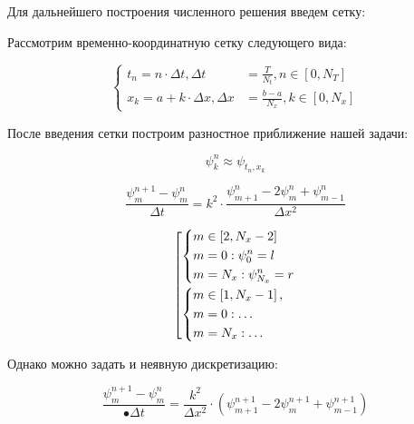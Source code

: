 \documentclass[10pt,a4paper]{article}
\begin{document}
		Для дальнейшего построения численного решения введем сетку:
		
		Рассмотрим временно-координатную сетку следующего вида:
		
		\begin{equation}
			\begin{cases}
				t_{n} = n\cdot \Delta t, \Delta t &= \frac{T}{N_{t}}, n \in 
				\left[0, N_{T}\right]
				\\
				x_{k} = a + k\cdot \Delta x, \Delta x &= \frac{b - a}{N_{x}}, 
				k \in \left[0, N_{x}\right]
			\end{cases}
		\end{equation}
		
		После введения сетки построим разностное приближение нашей задачи:
		
		\begin{equation}
			\psi^{n}_{k} \approx \psi_{t_{n}, x_{k}}
		\end{equation}
		
		\begin{equation}
			\frac{\psi^{n + 1}_{m} - \psi^{n}_{m}}{\Delta t} = k^{2} \cdot
			\frac{\psi^{n}_{m + 1} - 2\psi^{n}_{m} + \psi^{n}_{m - 1}}{\Delta 
			x^{2}}
		\end{equation}
		
		\begin{equation}\left[ 
  \begin{gathered} 
    \left\{ 
      \begin{gathered} 
        m \in \left[2, N_{x} - 2\right] \hfill
        \\ 
        m = 0: \psi_{0}^{n} = l  \hfill
        \\ 
        m = N_{x}: \psi_{N_{x}}^{n} = r \hfill
      \end{gathered} 
    \right. \hfill 
    \\ 
    \left\{ 
      \begin{gathered} 
        m \in \left[1, N_{x} - 1\right], \hfill 
        \\ 
        m = 0: \ldots \hfill
        \\ 
        m = N_{x}: \ldots \hfill
      \end{gathered} 
    \right. \hfill 
    \\ 
  \end{gathered} 
\right.
		\end{equation}
		
		Однако можно задать и неявную дискретизацию:
		
		\begin{equation}
			\frac{\psi^{n + 1}_{m} - \psi^{n}_{m}}{•\Delta t} = \frac{k^{2}}
			{\Delta x^{2}}\cdot \left(\psi^{n + 1}_{m + 1} - 2\psi_{m}^{n + 1}
			+ \psi^{n + 1}_{m - 1}\right)
		\end{equation}
		
\end{document}

